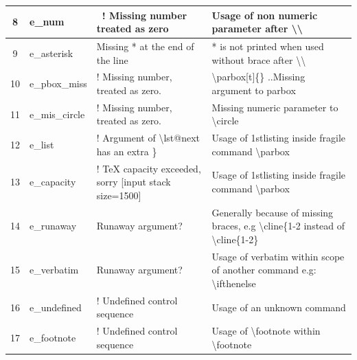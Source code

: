 \documentclass[12pt]{book}
\begin{document}
\begin{table}
\begin{tabular}{|c|l|l|l|}
		\hline
		8  & e\_num                     & ~! Missing number treated as zero                             & Usage of non numeric parameter after \textbackslash{}\textbackslash{}                                                        \\ 
		\hline
		9  & e\_asterisk                & Missing * at the end of the line                              & * is not printed when used without brace after \textbackslash{}\textbackslash{}                                              \\ 
		\hline
		10 & e\_pbox\_miss              & ! Missing number, treated as zero.                            & \textbackslash{}parbox[t]\{\} ..Missing argument to parbox                                                                   \\ 
		\hline
		11 & e\_mis\_circle             & ! Missing number, treated as zero.                            & Missing numeric parameter to \textbackslash{}circle                                                                          \\ 
		\hline
		12 & e\_list                    & ! Argument of \textbackslash{}lst@next has an extra \}        & Usage of 1stlisting inside fragile command \textbackslash{}parbox                                                            \\ 
		\hline
		13 & e\_capacity                & ! TeX capacity exceeded, sorry [input stack size=1500]        & Usage of 1stlisting inside fragile command \textbackslash{}parbox                                                            \\ 
		\hline
		14 & e\_runaway                 & Runaway argument?                                             & Generally because of missing braces, e.g \textbackslash{}cline\{1-2 instead of 
		\textbackslash{}cline\{1-2\}           \\ 
		\hline
		15 & e\_verbatim                & Runaway argument?                                             & Usage of verbatim within scope of another command e.g: \textbackslash{}ifthenelse                                            \\ 
		\hline
		16 & e\_undefined               & ! Undefined control sequence                                  & Usage of an unknown command                                                                                                  \\ 
		\hline
		17 & e\_footnote                & ! Undefined control sequence                                  & Usage of \textbackslash{}footnote within \textbackslash{}footnote                                                            \\ 

\end{tabular}
\end{table}
\end{document}

